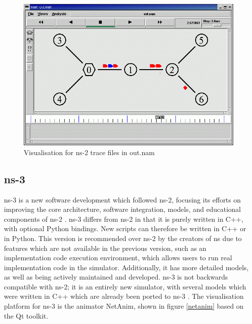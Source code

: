 \begin{figure}
\centering	
\includegraphics[scale=0.4]{img/outnam}	
\caption{ Visualisation for ns-2 trace files in out.nam}
\label{outnam}
\end{figure}

\subsection{ns-3}
\label{ns3design}
ns-3 is a new software development which followed  ns-2, focusing its efforts on improving the core architecture, software integration, models, and educational components of ns-2 \cite{ns2006}. ns-3 differs from ns-2 in that it is purely written in C++, with optional Python bindings. New scripts can therefore be written in C++ or in Python. This version is recommended over ns-2 by the creators of ns due to features which are not available in the previous version, such as an implementation code execution environment, which allows users to run real implementation code in the simulator. Additionally, it has more detailed models, as well as being actively maintained and developed. ns-3 is not backwards compatible with ns-2; it is an entirely new simulator, with several models which were written in C++ which are already been ported to ns-3 \cite{tommasopecorella2016}. The visualisation platform for ns-3 is the animator NetAnim, shown in figure \ref{netanim} based on the Qt toolkit.


